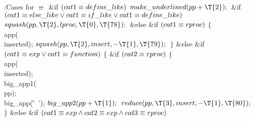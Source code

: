 \B{}:Cases for \X${}\equiv{}$\6
\&{if} ${}(\\{cat1}\equiv\\{define\_like}){}$\1\5
${}\\{make\_underlined}(\\{pp}+\T{2});{}$\2\6
\&{if} ${}(\\{cat1}\E\\{else\_like}\V\\{cat1}\E\\{if\_like}\V\\{cat1}\E%
\\{define\_like}){}$\1\5
${}\\{squash}(\\{pp},\39\T{2},\39\\{lproc},\39\T{0},\39\T{78});{}$\2\6
\&{else} \&{if} ${}(\\{cat1}\equiv\\{rproc}){}$\5
${}\{{}$\1\6
\\{app}(\\{inserted});\6
${}\\{squash}(\\{pp},\39\T{2},\39\\{insert},\39{-}\T{1},\39\T{79});{}$\6
\4${}\}{}$\2\6
\&{else} \&{if} ${}(\\{cat1}\equiv\\{exp}\lor\\{cat1}\equiv\\{function}){}$\5
${}\{{}$\1\6
\&{if} ${}(\\{cat2}\equiv\\{rproc}){}$\5
${}\{{}$\1\6
\\{app}(\\{inserted});\6
\\{big\_app1}(\\{pp});\6
\\{big\_app}(\.{'\ '});\6
${}\\{big\_app2}(\\{pp}+\T{1});{}$\6
${}\\{reduce}(\\{pp},\39\T{3},\39\\{insert},\39{-}\T{1},\39\T{80});{}$\6
\4${}\}{}$\2\6
\&{else} \&{if} ${}(\\{cat1}\E\\{exp}\W\\{cat2}\E\\{exp}\W\\{cat3}\E%
\\{rproc}){}$\5
